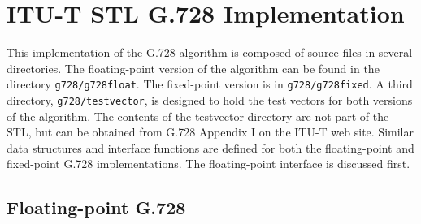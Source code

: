%
%
%
%
%
%
%

\section{ITU-T STL G.728 Implementation}

This implementation of the G.728 algorithm is composed of source
files in several directories. The floating-point version of the
algorithm can be found in the directory {\tt g728/g728float}. The fixed-point
version is in {\tt g728/g728fixed}.
A third directory, {\tt g728/testvector}, is designed to hold the test
vectors for both versions of the algorithm.
The contents of the testvector directory are not part of the STL, but
can be obtained from G.728 Appendix I on the ITU-T web site.
Similar data structures and interface functions are defined
for both the floating-point and fixed-point G.728 implementations.
The floating-point interface is discussed first.

\subsection {Floating-point G.728}

